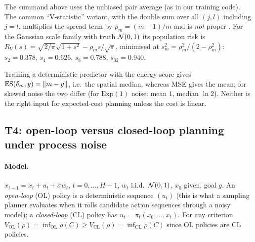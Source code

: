 \begin{remark}\label{rem:vstat}
The summand above uses the unbiased pair average (as in our training code). The common ``V-statistic'' variant, with the double sum over all $(j,l)$ including $j=l$, multiplies the spread term by $\rho_m=(m-1)/m$ and is \emph{not} proper \cite{ferro2014}.
For the Gaussian scale family with truth $\mathcal{N}(0,1)$ its population risk is $R_V(s)=\sqrt{2/\pi}\sqrt{1+s^2}-\rho_ms/\sqrt\pi$, minimised at $s_m^2=\rho_m^2/(2-\rho_m^2)$: $s_2=0.378$, $s_4=0.626$, $s_8=0.788$, $s_{32}=0.940$.
\end{remark}

\begin{remark}
Training a deterministic predictor with the energy score gives $\operatorname{ES}(\delta_m,y)=\|m-y\|$, i.e.\ the spatial median, whereas MSE gives the mean; for skewed noise the two differ (for $\mathrm{Exp}(1)$ noise: mean $1$, median $\ln2$). Neither is the right input for expected-cost planning unless the cost is linear.
\end{remark}

\subsection{T4: open-loop versus closed-loop planning under process noise}\label{sec:t4}

\paragraph{Model.}
$x_{t+1}=x_t+u_t+\sigma w_t$, $t=0,\dots,H-1$, $w_t$ i.i.d.\ $\mathcal{N}(0,1)$, $x_0$ given, goal $g$.
An \emph{open-loop} (OL) policy is a deterministic sequence $(u_t)$ (this is what a sampling planner evaluates when it rolls candidate action sequences through a noisy model); a \emph{closed-loop} (CL) policy has $u_t=\pi_t(x_0,\dots,x_t)$.
For any criterion $V_{\mathrm{OL}}(\rho)=\inf_{\mathrm{OL}}\rho(C)\ge V_{\mathrm{CL}}(\rho)=\inf_{\mathrm{CL}}\rho(C)$ since OL policies are CL policies.

